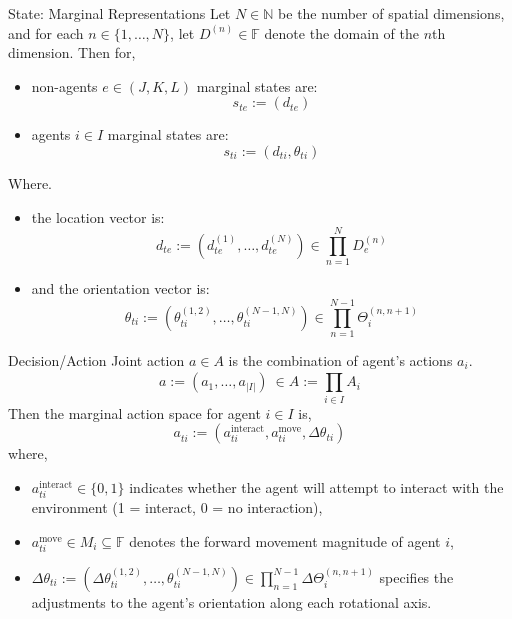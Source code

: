 \begin{frame}{State: Marginal Representations}
    Let \(N\in \mathbb{N}\) be the number of spatial dimensions,
    and for each \(n \in \{1, \dots, N\}\),
    let \(D^{(n)} \in \mathbb{F}\) denote the domain of the \(n\)th dimension.
    Then for,
    \begin{itemize}
        \item non-agents \(e\in (J, K, L)\) marginal states are: \vspace{-0.8em}
        \[
            s_{te} := (d_{te})
        \]
        \item agents \(i\in I\) marginal states are: \vspace{-0.8em}
        \[
            s_{ti} := (d_{ti}, \theta_{ti})
        \]
    \end{itemize}
    Where.
    \begin{itemize}
        \item the location vector is: \vspace{-0.8em}
        \[
            d_{te} := \left(d_{te}^{(1)},\ldots, d_{te}^{(N)}\right) \in \prod_{n=1}^{N} D_{e}^{(n)}
        \]
        \item and the orientation vector is: \vspace{-0.8em}
        \[
            \theta_{ti} := \left(\theta_{ti}^{(1,2)},\ldots, \theta_{ti}^{(N-1,N)}\right) \in \prod_{n=1}^{N-1} \Theta_{i}^{(n,n+1)}
        \]
    \end{itemize}
\end{frame}

\begin{frame}{Decision/Action}
    Joint action \(a \in A\) is the combination of agent's actions \(a_i\).
    \[
        a := \left(a_{1}, \ldots, a_{|I|}\right) \ \in A := \prod_{i\in I}^{} A_i
    \]
    Then the marginal action space for agent \(i\in I\) is,
    \[
        a_{ti}^{} := (a_{ti}^\text{interact},a_{ti}^\text{move},\Delta\theta_{ti})
    \]
    where,
    \begin{itemize}
        \item \(a_{ti}^\text{interact} \in \{0,1\}\) indicates whether the agent will attempt 
            to interact with the environment (1 = interact, 0 = no interaction),
        \item \(a_{ti}^\text{move} \in M_i \subseteq \mathbb{F}\) 
            denotes the forward movement magnitude of agent \(i\),
        \item \(\Delta\theta_{ti} := \left(\Delta\theta_{ti}^{(1,2)},\ldots, 
            \theta_{ti}^{(N-1,N)}\right) \in \prod_{n=1}^{N-1} \Delta\Theta_{i}^{(n,n+1)}\) 
            specifies the adjustments to the agent's orientation along each rotational axis.
    \end{itemize}
\end{frame}

